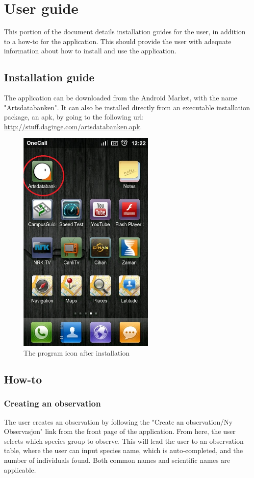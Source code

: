 \newpage
\section{User guide}
This portion of the document details installation guides for the user, in addition to a how-to for the application. This should provide the user with adequate information about how to install and use the application.
\subsection{Installation guide}
The application can be downloaded from the Android Market, with the name "Artsdatabanken". It can also be installed directly from an executable installation package, an apk, by going to the following url: \url{http://stuff.daginge.com/artsdatabanken.apk}.

\begin{figure}[h!]
\centering
 \includegraphics[width=0.6\textwidth,height=0.9\textwidth]{appendix/pic/run.jpg} 
 \caption{The program icon after installation}
 \end{figure}

\subsection{How-to}
\subsubsection{Creating an observation}
The user creates an observation by following the "Create an observation/Ny
Observasjon" link from the front page of the application.  From here, the user
selects which species group to observe.  This will lead the user to an
observation table, where the user can input species name, which is
auto-completed, and the number of individuals found.  Both common names and
scientific names are applicable. 

